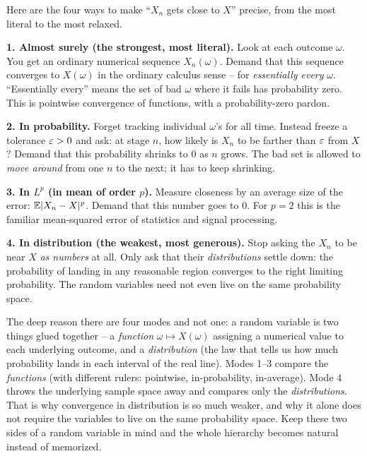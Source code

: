 Here are the four ways to make ``$X_n$ gets close to $X$'' precise, from the most
literal to the most relaxed.

\textbf{1. Almost surely (the strongest, most literal).} Look at each outcome
$\omega$. You get an ordinary numerical sequence $X_n(\omega)$. Demand that this
sequence converges to $X(\omega)$ in the ordinary calculus sense -- for
\emph{essentially every} $\omega$. ``Essentially every'' means the set of bad
$\omega$ where it fails has probability zero. This is pointwise convergence of
functions, with a probability-zero pardon.

\textbf{2. In probability.} Forget tracking individual $\omega$'s for all time.
Instead freeze a tolerance $\varepsilon > 0$ and ask: at stage $n$, how likely is $X_n$ to be
farther than $\varepsilon$ from $X$? Demand that this probability shrinks to $0$ as $n$ grows.
The bad set is allowed to \emph{move around} from one $n$ to the next; it has to
keep shrinking.

\textbf{3. In $L^p$ (in mean of order $p$).} Measure closeness by an average size of
the error: $\operatorname{\mathbb{E}}\lvert X_n - X\rvert^p$. Demand that this number goes to $0$. For $p=2$ this
is the familiar mean-squared error of statistics and signal processing.

\textbf{4. In distribution (the weakest, most generous).} Stop asking the $X_n$ to be
near $X$ \emph{as numbers} at all. Only ask that their \emph{distributions} settle
down: the probability of landing in any reasonable region converges to the right
limiting probability. The random variables need not even live on the same probability
space.

\begin{happeningbox}
The deep reason there are four modes and not one: a random variable is two things glued
together -- a \emph{function} $\omega \mapsto X(\omega)$ assigning a numerical value
to each underlying outcome, and a \emph{distribution} (the law that tells us how much
probability lands in each interval of the real line). Modes 1--3 compare the
\emph{functions} (with different rulers: pointwise, in-probability, in-average). Mode 4
throws the underlying sample space away and compares only the \emph{distributions}.
That is why convergence in distribution is so much weaker, and why it alone does not
require the variables to live on the same probability space. Keep these two sides of a
random variable in mind and the whole hierarchy becomes natural instead of memorized.
\end{happeningbox}

